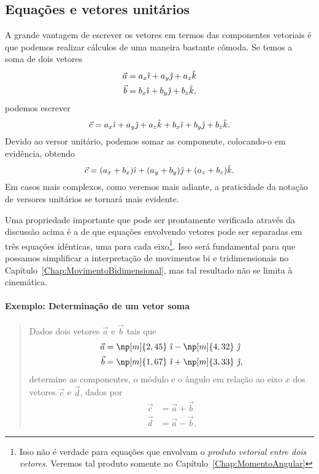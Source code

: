 \subsection{Equações e vetores unitários}

A grande vantagem de escrever os vetores em termos das componentes vetoriais é que podemos realizar cálculos de uma maneira bastante cômoda. Se temos a soma de dois vetores 
\begin{align}
  \vec{a} &= a_x \hat{\imath} + a_y \hat{\jmath} + a_z \hat{k} \\
  \vec{b} &= b_x \hat{\imath} + b_y \hat{\jmath} + b_z \hat{k},
\end{align}
%
podemos escrever
\begin{equation}
  \vec{c} = a_x \hat{\imath} + a_y \hat{\jmath} + a_z \hat{k} + b_x \hat{\imath} + b_y \hat{\jmath} + b_z \hat{k}.
\end{equation}
%
Devido ao versor unitário, podemos somar as componente, colocando-o em evidência, obtendo
\begin{equation}
  \vec{c} = (a_x + b_x) \hat{\imath} + (a_y + b_y) \hat{\jmath} + (a_z + b_z)\hat{k}.
\end{equation}
%
Em casos mais complexos, como veremos mais adiante, a praticidade da notação de versores unitários se tornará mais evidente.

Uma propriedade importante que pode ser prontamente verificada através da discussão acima é a de que equações envolvendo vetores pode ser separadas em três equações idênticas, uma para cada eixo\footnote{Isso não é verdade para equações que envolvam o \emph{produto vetorial entre dois vetores}. Veremos tal produto somente no Capítulo~\ref{Chap:MomentoAngular}}. Isso será fundamental para que possamos simplificar a interpretação de movimentos bi e tridimensionais no Capítulo~\ref{Chap:MovimentoBidimensional}, mas tal resultado não se limita à cinemática.

\paragraph{Exemplo: Determinação de um vetor soma}

\begin{quote}
    Dados dois vetores $\vec{a}$ e $\vec{b}$ tais que
        \begin{align}
            \vec{a} &= \np[m]{2,45}~\versi - \np[m]{4,32}~\versj \\
            \vec{b} &= \np[m]{1,67}~\versi + \np[m]{3,33}~\versj,
        \end{align}
    determine as componentes, o módulo e o ângulo em relação ao eixo $x$ dos vetores $\vec{c}$ e $\vec{d}$, dados por
        \begin{align}
            \vec{c} &= \vec{a} + \vec{b} \\
            \vec{d} &= \vec{a} - \vec{b}.
        \end{align}
\end{quote}

